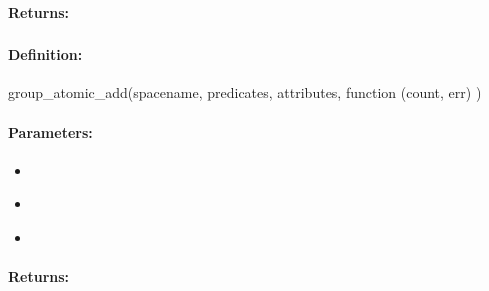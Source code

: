 \paragraph{Returns:}


\pagebreak
\subsubsection{}
\label{api:nodejs:group_atomic_add}


\paragraph{Definition:}
\begin{javascriptcode}
group_atomic_add(spacename, predicates, attributes, function (count, err) {})
\end{javascriptcode}
\paragraph{Parameters:}
\begin{itemize}[noitemsep]
\item {}\\

\item {}\\

\item {}\\

\end{itemize}

\paragraph{Returns:}


\pagebreak
\subsubsection{}
\label{api:nodejs:atomic_add}


